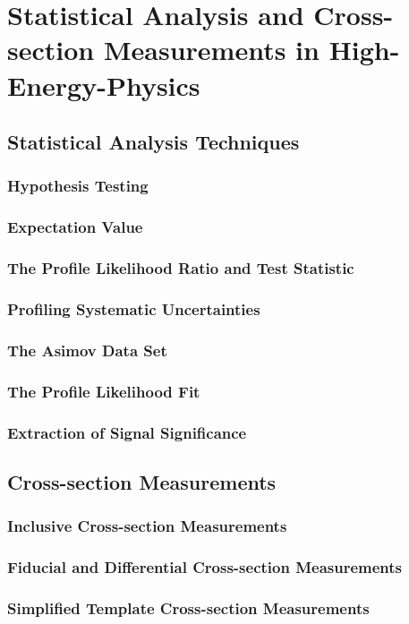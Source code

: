 \chapter{Statistical Analysis and Cross-section Measurements in High-Energy-Physics}
\label{chap:statistics}

\section{Statistical Analysis Techniques}
\subsection{Hypothesis Testing}
\subsection{Expectation Value}
\subsection{The Profile Likelihood Ratio and Test Statistic}
\subsection{Profiling Systematic Uncertainties}
\subsection{The Asimov Data Set}
\subsection{The Profile Likelihood Fit}
\subsection{Extraction of Signal Significance}

\section{Cross-section Measurements}
\subsection{Inclusive Cross-section Measurements}
\subsection{Fiducial and Differential Cross-section Measurements}
\subsection{Simplified Template Cross-section Measurements}
